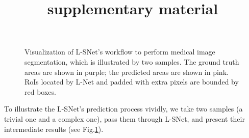 \documentclass{article}
\title{supplementary material}
\begin{document}
%
\maketitle
%
\begin{figure}[hb]
    \centering
    \caption{
    Visualization of L-SNet's workflow to perform medical image segmentation, which is illustrated by two samples. The ground truth areas are shown in purple; the predicted areas are shown in pink. RoIs located by L-Net and padded with extra pixels are bounded by red boxes.}
    \label{fig:s1}
\end{figure}

To illustrate the L-SNet's prediction process vividly, we take two samples (a trivial one and a complex one), pass them through L-SNet, and present their intermediate results (see Fig.\ref{fig:s1}).
\end{document}
